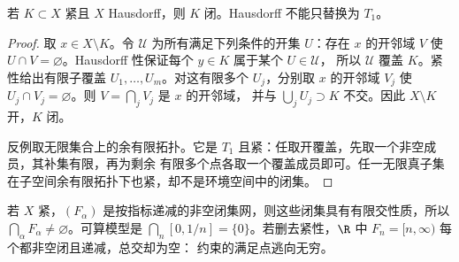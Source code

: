 \begin{proposition}\label{proposition:1-2-1-3}
若 \(K\subset X\) 紧且 \(X\) Hausdorff，则 \(K\) 闭。Hausdorff 不能只替换为 \(T_1\)。
\end{proposition}
\begin{proof}
取 \(x\in X\setminus K\)。令 \(\mathscr U\) 为所有满足下列条件的开集 \(U\)：存在 \(x\) 的开邻域
\(V\) 使 \(U\cap V=\varnothing\)。Hausdorff 性保证每个 \(y\in K\) 属于某个 \(U\in\mathscr U\)，
所以 \(\mathscr U\) 覆盖 \(K\)。紧性给出有限子覆盖 \(U_1,\ldots,U_m\)。对这有限多个 \(U_j\)，分别取
\(x\) 的开邻域 \(V_j\) 使 \(U_j\cap V_j=\varnothing\)。则 \(V=\bigcap_jV_j\) 是 \(x\) 的开邻域，
并与 \(\bigcup_jU_j\supset K\) 不交。因此 \(X\setminus K\) 开，\(K\) 闭。

反例取无限集合上的余有限拓扑。它是 \(T_1\) 且紧：任取开覆盖，先取一个非空成员，其补集有限，再为剩余
有限多个点各取一个覆盖成员即可。任一无限真子集在子空间余有限拓扑下也紧，却不是环境空间中的闭集。
\end{proof}

\begin{example}[递减闭集网]\label{ex:1-2-1-2}
若 \(X\) 紧，\((F_\alpha)\) 是按指标递减的非空闭集网，则这些闭集具有有限交性质，所以
\(\bigcap_\alpha F_\alpha\ne\varnothing\)。可算模型是
\(\bigcap_n[0,1/n]=\{0\}\)。若删去紧性，\(\R\) 中 \(F_n=[n,\infty)\) 每个都非空闭且递减，总交却为空：
约束的满足点逃向无穷。
\end{example}

